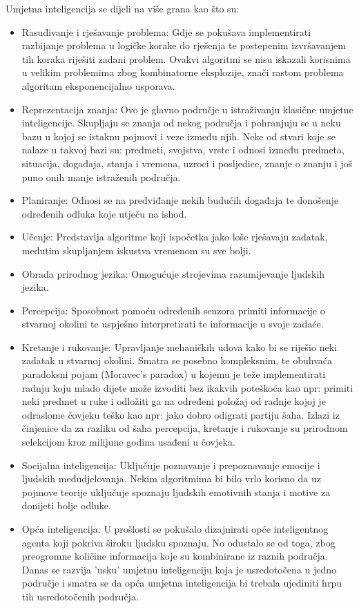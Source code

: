 Umjetna inteligencija se dijeli na više grana kao što su:
\begin{itemize}
	\item Rasuđivanje i rješavanje problema: Gdje se pokušava implementirati razbijanje problema u logičke korake do rješenja te postepenim izvršavanjem tih koraka riješiti zadani problem. Ovakvi algoritmi se nisu iskazali korisnima u velikim problemima zbog kombinatorne eksplozije, znači rastom problema algoritam eksponencijalno usporava.
	
	\item Reprezentacija znanja: Ovo je glavno područje u istraživanju klasične umjetne inteligencije. Skupljaju se znanja od nekog područja i pohranjuju se u neku bazu u kojoj se istaknu pojmovi i veze između njih. Neke od stvari koje se nalaze u takvoj bazi su: predmeti, svojstva, vrste i odnosi između predmeta, situacija, događaja, stanja i vremena, uzroci i posljedice, znanje o znanju i još puno onih manje istraženih područja.
	
	\item Planiranje: Odnosi se na predviđanje nekih budućih događaja te donošenje određenih odluka koje utječu na ishod.
	
	\item Učenje: Predstavlja algoritme koji ispočetka jako loše rješavaju zadatak, međutim skupljanjem iskustva vremenom su sve bolji.
	
	\item Obrada prirodnog jezika: Omogućuje strojevima razumijevanje ljudskih jezika.
	
	\item Percepcija: Sposobnost pomoću određenih senzora primiti informacije o stvarnoj okolini te uspješno interpretirati te informacije u svoje zadaće.
	
	\item Kretanje i rukovanje: Upravljanje mehaničkih udova kako bi se riješio neki zadatak u stvarnoj okolini. Smatra se posebno kompleksnim, te obuhvaća paradoksni pojam (Moravec's paradox) u kojemu je teže implementirati radnju koju mlado dijete može izvoditi bez ikakvih poteškoća kao npr: primiti neki predmet u ruke i odložiti ga na određeni položaj od radnje kojoj je odraslome čovjeku teško kao npr: jako dobro odigrati partiju šaha. Izlazi iz činjenice da za razliku od šaha percepcija, kretanje i rukovanje su prirodnom selekcijom kroz milijune godina usađeni u čovjeka.
	
	\item Socijalna inteligencija: Uključuje poznavanje i prepoznavanje emocije i ljudskih međudjelovanja. Nekim algoritmima bi bilo vrlo korisno da uz pojmove teorije uključuje spoznaju ljudskih emotivnih stanja i motive za donijeti bolje odluke.
	
	\item Opća inteligencija: U prošlosti se pokušalo dizajnirati opće inteligentnog agenta koji pokriva široku ljudsku spoznaju. No odustalo se od toga, zbog preogromne količine informacija koje su kombinirane iz raznih područja. Danas se razvija 'usku' umjetnu inteligenciju koja je usredotočena u jedno područje i smatra se da opća umjetna inteligencija bi trebala ujediniti hrpu tih usredotočenih područja.
\end{itemize}

